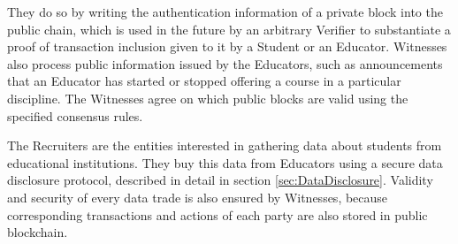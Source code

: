They do so by writing the authentication information of a private block into the
public chain, which is used in the future by an arbitrary Verifier to
substantiate a proof of transaction inclusion given to it by a Student or an
Educator. Witnesses also process public information issued by the Educators,
such as announcements that an Educator has started or stopped offering a course
in a particular discipline. The Witnesses agree on which public blocks are valid
using the specified consensus rules.

The Recruiters are the entities interested in gathering data about students from
educational institutions. They buy this data from Educators using a secure data
disclosure protocol, described in detail in section \ref{sec:DataDisclosure}.
Validity and security of every data trade is also ensured by Witnesses, because
corresponding transactions and actions of each party are also stored in public
blockchain.
